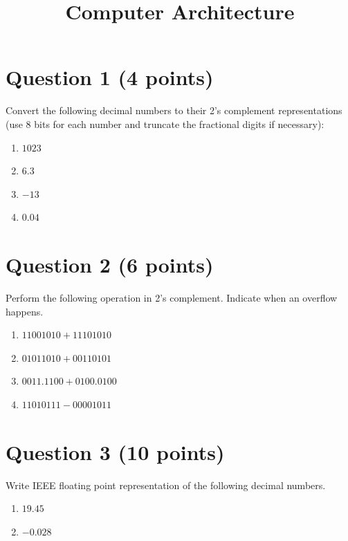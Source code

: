 \documentclass{article}
\title{Computer Architecture}
\begin{document}
	\section*{Question 1 (4 points)}
	Convert the following decimal numbers to their 2’s complement representations (use 8 bits for each number and truncate the fractional digits if necessary):
	\begin{enumerate}
		\item $1023$
		\item $6.3$
		\item $-13$
		\item $0.04$
	\end{enumerate}
	
	\begin{solution}
	\end{solution}
	
	
	\section*{Question 2 (6 points)}
	Perform the following operation in 2’s complement. Indicate when an overflow happens. 
	\begin{enumerate}
		\item $11001010  + 11101010$
		\item $01011010 + 00110101$
		\item $0011.1100 + 0100.0100$
		\item $11010111 - 00001011$
	\end{enumerate}
	
	\begin{solution}
	\end{solution}
	
	
	\section*{Question 3 (10 points)}
	Write IEEE floating point representation of the following decimal numbers.
	\begin{enumerate}
		\item $19.45$
		\item $-0.028$
	\end{enumerate}
	
\end{document}
